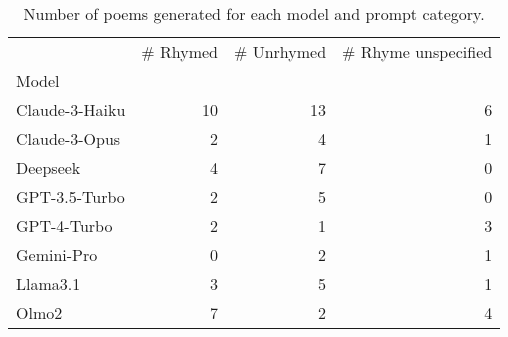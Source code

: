 \begin{table}[H]
  \centering
  \small
  \singlespacing
  \begin{tabular}{lrrr}
  \toprule
   & \# Rhymed & \# Unrhymed & \# Rhyme unspecified \\
  Model &  &  &  \\
  \midrule
  Claude-3-Haiku & 10 & 13 & 6 \\
  Claude-3-Opus & 2 & 4 & 1 \\
  Deepseek & 4 & 7 & 0 \\
  GPT-3.5-Turbo & 2 & 5 & 0 \\
  GPT-4-Turbo & 2 & 1 & 3 \\
  Gemini-Pro & 0 & 2 & 1 \\
  Llama3.1 & 3 & 5 & 1 \\
  Olmo2 & 7 & 2 & 4 \\
  \bottomrule
  \end{tabular}
  \caption{Number of poems generated for each model and prompt category.}
  \label{tab:num_poems_models}
\end{table}